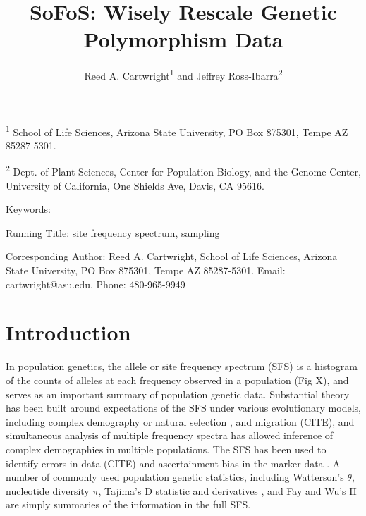 \documentclass[11pt,letterpaper]{article}
\title{SoFoS: Wisely Rescale Genetic Polymorphism Data}
\author{Reed A. Cartwright\textsuperscript{1} and %
Jeffrey Ross-Ibarra\textsuperscript{2}%
}
\date{}
\begin{document}
\maketitle

\noindent%
\textsuperscript{1}%
School of Life Sciences, Arizona State University, PO Box 875301, Tempe AZ 85287-5301. %

\noindent
\textsuperscript{2}%
Dept. of Plant Sciences, Center for Population Biology, and the Genome Center, University of California, One Shields Ave, Davis, CA 95616.

Keywords:

Running Title: site frequency spectrum, sampling %

Corresponding Author: Reed A. Cartwright, School of Life Sciences, Arizona State University, PO Box 875301, Tempe AZ 85287-5301.  Email: cartwright@asu.edu.  Phone: 480-965-9949


\newpage
\linenumbers

\section{Introduction}

In population genetics, the allele or site frequency spectrum (SFS) is a histogram of the counts of alleles at each frequency observed in a population (Fig X), and serves as an important summary of population genetic data.   Substantial theory has been built around expectations of the SFS under various evolutionary models, including complex demography \citep{Gutenkunst2009} or natural selection \citep{Nielsen2005a}, and migration (CITE), and simultaneous analysis of multiple frequency spectra has allowed inference of complex demographies in multiple populations. The SFS has been used to identify errors in data (CITE) and ascertainment bias in the marker data \citep{Nielsen2004}.  A number of commonly used population genetic statistics, including Watterson's \citep{Watterson1975} $\theta$, nucleotide diversity $\pi$, Tajima's \citep{Tajima1989} D statistic and derivatives \citep{Fu1993}, and Fay and Wu's H \citep{Fay2000} %
are simply summaries of the information in the full SFS.  
\end{document}
